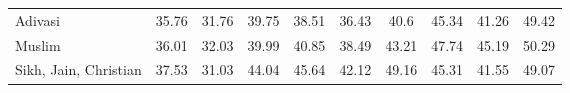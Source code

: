 \begin{table}[htbp]
\begin{tabular}{l*{9}{c}}
Adivasi             &       35.76&       31.76&       39.75&       38.51&       36.43&        40.6&       45.34&       41.26&       49.42\\
Muslim              &       36.01&       32.03&       39.99&       40.85&       38.49&       43.21&       47.74&       45.19&       50.29\\
Sikh, Jain, Christian&       37.53&       31.03&       44.04&       45.64&       42.12&       49.16&       45.31&       41.55&       49.07\\
\bottomrule
\end{tabular}
\end{table}
